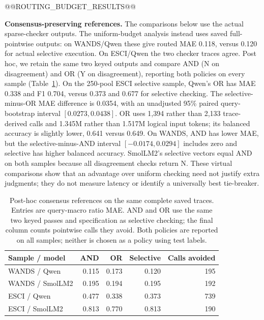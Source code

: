 \documentclass[conference]{IEEEtran}
\begin{document}
@@ROUTING_BUDGET_RESULTS@@

\textbf{Consensus-preserving references.} The comparisons below use the actual sparse-checker outputs. The uniform-budget analysis instead uses saved full-pointwise outputs: on WANDS/Qwen these give routed MAE 0.118, versus 0.120 for actual selective execution. On ESCI/Qwen the two checker traces agree. 
Post hoc, we retain the same two keyed outputs and compare AND (N on disagreement)
and OR (Y on disagreement), reporting both policies on every sample
(Table~\ref{tab:consensus}). On the 250-pool ESCI selective sample, Qwen's OR has MAE 0.338 and F1 0.704,
versus 0.373 and 0.677 for selective checking. The selective-minus-OR MAE
difference is 0.0354, with an unadjusted 95\% paired query-bootstrap interval
$[0.0273,0.0438]$. OR uses 1,394 rather than 2,133 trace-derived calls and
1.345M rather than 1.517M logical input tokens; its balanced accuracy is
slightly lower, 0.641 versus 0.649. On WANDS, AND has lower MAE, but the
selective-minus-AND interval $[-0.0174,0.0294]$ includes zero and selective
has higher balanced accuracy. SmolLM2's selective vectors equal AND on both
samples because all disagreement checks return N. These virtual comparisons
show that an advantage over uniform checking need not justify extra judgments;
they do not measure latency or identify a universally best tie-breaker.

\begin{table}[t]
\caption{Post-hoc consensus references on the same complete saved traces.
Entries are query-macro ratio MAE. AND and OR use the same two keyed passes
and specification as selective checking; the final column counts pointwise
calls they avoid. Both policies are reported on all samples; neither is chosen as a policy using test labels.}
\label{tab:consensus}
\centering\footnotesize
\begin{tabular}{lrrrr}
\toprule
Sample / model & AND & OR & Selective & Calls avoided \\
\midrule
WANDS / Qwen & 0.115 & 0.173 & 0.120 & 195 \\
WANDS / SmolLM2 & 0.195 & 0.194 & 0.195 & 192 \\
ESCI / Qwen & 0.477 & 0.338 & 0.373 & 739 \\
ESCI / SmolLM2 & 0.813 & 0.770 & 0.813 & 190 \\
\bottomrule
\end{tabular}
\end{table}
\end{document}
